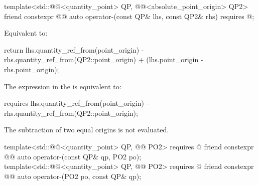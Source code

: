 \begin{itemdecl}
template<std::@@<quantity_point> QP, @@<absolute_point_origin> QP2>
friend constexpr @@ auto operator-(const QP& lhs, const QP2& rhs)
  requires @\seebelownc@;
\end{itemdecl}

\begin{itemdescr}
\pnum
\effects
Equivalent to:
\begin{codeblock}
return lhs.quantity_ref_from(point_origin) - rhs.quantity_ref_from(QP2::point_origin) +
       (lhs.point_origin - rhs.point_origin);
\end{codeblock}

\pnum
\remarks
The expression in the  is equivalent to:
\begin{codeblock}
requires { lhs.quantity_ref_from(point_origin) - rhs.quantity_ref_from(QP2::point_origin); }
\end{codeblock}

\pnum
\recommended
The subtraction of two equal origins is not evaluated.
\end{itemdescr}

\begin{itemdecl}
template<std::@@<quantity_point> QP, @@ PO2>
  requires @\seebelownc@
friend constexpr @@ auto operator-(const QP& qp, PO2 po);
template<std::@@<quantity_point> QP, @@ PO2>
  requires @\seebelownc@
friend constexpr @@ auto operator-(PO2 po, const QP& qp);
\end{itemdecl}

